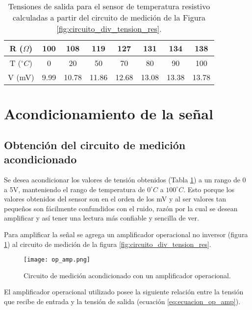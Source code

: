 \documentclass[journal,trans]{IEEEtran}
\begin{document}
\begin{table}[htb]
    \begin{center}
        \caption{Tensiones de salida para el sensor de temperatura resistivo calculadas a partir del circuito de medición de la Figura \ref{fig:circuito_div_tension_res}.}
        \label{tab:tensiones_salida}
        \begin{tabular}{c | c | c | c | c | c | c | c}
            \hline
            R ($\Omega$) & 100 & 108 & 119 & 127 & 131 & 134 & 138 \\
            \hline
            T ($^{\circ}C$) & 0 & 20 & 50 & 70 & 80 & 90 & 100  \\
            \hline
            V (mV) & 9.99 & 10.78 & 11.86 & 12.68 & 13.08 & 13.38 & 13.78  \\
            \hline
        \end{tabular}
    \end{center}
\end{table}



\section{Acondicionamiento de la señal}
\subsection{Obtención del circuito de medición acondicionado}
Se desea acondicionar los valores de tensión obtenidos (Tabla \ref{tab:tensiones_salida}) a un rango de 0 a 5V, manteniendo el rango de temperatura de $0^{\circ}C$ a $100^{\circ}C$. Esto porque los valores obtenidos del sensor son en el orden de los mV y al ser valores tan pequeños son fácilmente confundidos con el ruido, razón por la cual se desean amplificar y así tener una lectura más confiable y sencilla de ver.

Para amplificar la señal se agrega un amplificador operacional no inversor (figura \ref{fig:op_amp}) al circuito de medición de la figura \ref{fig:circuito_div_tension_res}.

\begin{figure}[hbtp]
	\centering
	\texttt{[image: op\_amp.png]}
	\caption[Figura 2]{Circuito de medición acondicionado con un amplificador operacional.}
    \label{fig:op_amp}
\end{figure}

El amplificador operacional utilizado posee la siguiente relación entre la tensión que recibe de entrada y la tensión de salida (ecuación \ref{eq:ecuacion_op_amp}).
\end{document}
